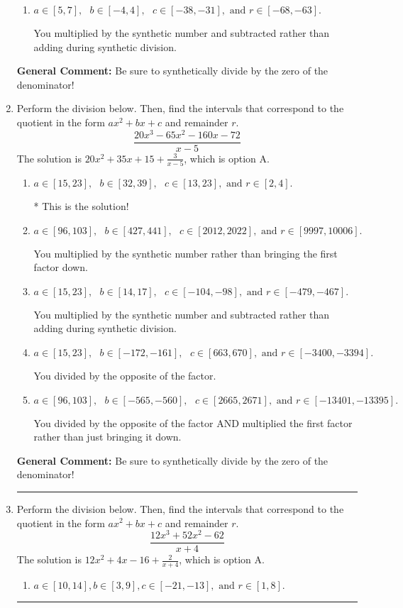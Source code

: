 \documentclass{extbook}[14pt]
\newcommand{\litem}[1]{\item #1

\rule{\textwidth}{0.4pt}}
\begin{document}
\begin{enumerate}
{\begin{enumerate}[label=\Alph*.]
 You divided by the opposite of the factor.
\item \( a \in [5, 7], \text{   } b \in [-4, 4], \text{   } c \in [-38, -31], \text{   and   } r \in [-68, -63]. \)

 You multiplied by the synthetic number and subtracted rather than adding during synthetic division.
\end{enumerate}

\textbf{General Comment:} Be sure to synthetically divide by the zero of the denominator!
}
\litem{
Perform the division below. Then, find the intervals that correspond to the quotient in the form $ax^2+bx+c$ and remainder $r$.
\[ \frac{20x^{3} -65 x^{2} -160 x -72}{x -5} \]The solution is \( 20x^{2} +35 x + 15 + \frac{3}{x -5} \), which is option A.\begin{enumerate}[label=\Alph*.]
\item \( a \in [15, 23], \text{   } b \in [32, 39], \text{   } c \in [13, 23], \text{   and   } r \in [2, 4]. \)

* This is the solution!
\item \( a \in [96, 103], \text{   } b \in [427, 441], \text{   } c \in [2012, 2022], \text{   and   } r \in [9997, 10006]. \)

 You multiplied by the synthetic number rather than bringing the first factor down.
\item \( a \in [15, 23], \text{   } b \in [14, 17], \text{   } c \in [-104, -98], \text{   and   } r \in [-479, -467]. \)

 You multiplied by the synthetic number and subtracted rather than adding during synthetic division.
\item \( a \in [15, 23], \text{   } b \in [-172, -161], \text{   } c \in [663, 670], \text{   and   } r \in [-3400, -3394]. \)

 You divided by the opposite of the factor.
\item \( a \in [96, 103], \text{   } b \in [-565, -560], \text{   } c \in [2665, 2671], \text{   and   } r \in [-13401, -13395]. \)

 You divided by the opposite of the factor AND multiplied the first factor rather than just bringing it down.
\end{enumerate}

\textbf{General Comment:} Be sure to synthetically divide by the zero of the denominator!
}
\litem{
Perform the division below. Then, find the intervals that correspond to the quotient in the form $ax^2+bx+c$ and remainder $r$.
\[ \frac{12x^{3} +52 x^{2} -62}{x + 4} \]The solution is \( 12x^{2} +4 x -16 + \frac{2}{x + 4} \), which is option A.\begin{enumerate}[label=\Alph*.]
\item \( a \in [10, 14], b \in [3, 9], c \in [-21, -13], \text{ and } r \in [1, 8]. \)


\end{enumerate}}
\end{enumerate}
\end{document}
